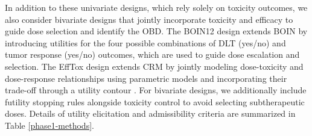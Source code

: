 \documentclass[11pt]{article}
\begin{document}
In addition to these univariate designs, which rely solely on toxicity outcomes, we also consider bivariate designs that jointly incorporate toxicity and efficacy to guide dose selection and identify the OBD. The BOIN12 design extends BOIN by introducing utilities for the four possible combinations of DLT (yes/no) and tumor response (yes/no) outcomes, which are used to guide dose escalation and selection. The EffTox design extends CRM by jointly modeling dose-toxicity and dose-response relationships using parametric models and incorporating their trade-off through a utility contour \parencite{EffTox,EffTox_hyperparameters}. For bivariate designs, we additionally include futility stopping rules alongside toxicity control to avoid selecting subtherapeutic doses. Details of utility elicitation and admissibility criteria are summarized in Table \ref{phase1-methods}.
\end{document}
